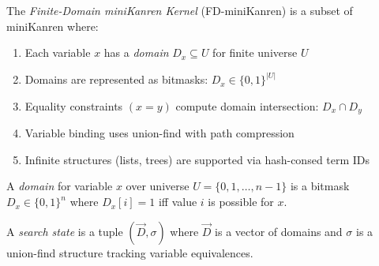 %



\newcommand{\fdmk}{FD-miniKanren\xspace}  %

\begin{definition}
\label{def:fdmk}
The \emph{Finite-Domain miniKanren Kernel} (\fdmk) is a subset of miniKanren
where:
\begin{enumerate}
  \item Each variable $x$ has a \emph{domain} $D_x \subseteq U$ for finite universe $U$
  \item Domains are represented as bitmasks: $D_x \in \{0,1\}^{|U|}$
  \item Equality constraints $(x = y)$ compute domain intersection: $D_x \cap D_y$
  \item Variable binding uses union-find with path compression
  \item Infinite structures (lists, trees) are supported via hash-consed term IDs
\end{enumerate}
\end{definition}

\begin{definition}[Domain]
A \emph{domain} for variable $x$ over universe $U = \{0, 1, \ldots, n-1\}$ is a
bitmask $D_x \in \{0,1\}^n$ where $D_x[i] = 1$ iff value $i$ is possible for $x$.
\end{definition}

\begin{definition}
A \emph{search state} is a tuple $(\vec{D}, \sigma)$ where $\vec{D}$ is a
vector of domains and $\sigma$ is a union-find structure tracking variable
equivalences.
\end{definition}


